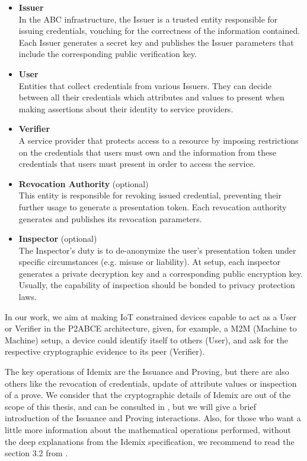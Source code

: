 \begin{itemize}
	\item \textbf{Issuer}\\
	In the ABC infrastructure, the Issuer is a trusted entity responsible for issuing credentials, vouching for the correctness of the information contained. Each Issuer generates a secret key and publishes the Issuer parameters that include the corresponding public verification key.
	
	\item \textbf{User}\\
	Entities that collect credentials from various Issuers. They can decide between all their credentials which attributes and values to present when making assertions about their identity to service providers.
	
	\item \textbf{Verifier}\\
	A service provider that protects access to a resource by imposing restrictions on the credentials that users must own and the information from these credentials that users must present in order to access the service.
	
	\item \textbf{Revocation Authority} (optional)\\
	This entity is responsible for revoking issued credential, preventing their further usage to generate a presentation token. Each revocation authority generates and publishes its revocation parameters.
	
	\item \textbf{Inspector} (optional)\\
	The Inspector's duty is to de-anonymize the user's presentation token under specific circumstances (e.g. misuse or liability). At setup, each inspector generates a private decryption key and a corresponding public encryption key. Usually, the capability of inspection should be bonded to privacy protection laws.
	
\end{itemize}

In our work, we aim at making IoT constrained devices capable to act as a User or Verifier in the P2ABCE architecture, given, for example, a M2M (Machine to Machine) setup, a device could identify itself to others (User), and ask for the respective cryptographic evidence to its peer (Verifier).


The key operations of Idemix are the Issuance and Proving, but there are also others like the revocation of credentials, update of attribute values or inspection of a prove. We consider that the cryptographic details of Idemix are out of the scope of this thesis, and can be consulted in \citep{idemixSpec}, but we will give a brief introduction of the Issuance and Proving interactions. Also, for those who want a little more information about the mathematical operations performed, without the deep explanations from the Idemix specification, we recommend to read the section 3.2 from \citep{vullers2013efficient}.


